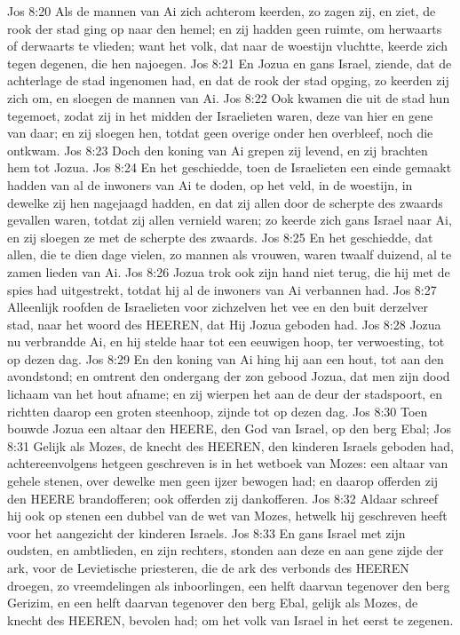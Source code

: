 Jos 8:20  Als de mannen van Ai zich achterom keerden, zo zagen zij, en ziet, de rook der stad ging op naar den hemel; en zij hadden geen ruimte, om herwaarts of derwaarts te vlieden; want het volk, dat naar de woestijn vluchtte, keerde zich tegen degenen, die hen najoegen.
Jos 8:21  En Jozua en gans Israel, ziende, dat de achterlage de stad ingenomen had, en dat de rook der stad opging, zo keerden zij zich om, en sloegen de mannen van Ai.
Jos 8:22  Ook kwamen die uit de stad hun tegemoet, zodat zij in het midden der Israelieten waren, deze van hier en gene van daar; en zij sloegen hen, totdat geen overige onder hen overbleef, noch die ontkwam.
Jos 8:23  Doch den koning van Ai grepen zij levend, en zij brachten hem tot Jozua.
Jos 8:24  En het geschiedde, toen de Israelieten een einde gemaakt hadden van al de inwoners van Ai te doden, op het veld, in de woestijn, in dewelke zij hen nagejaagd hadden, en dat zij allen door de scherpte des zwaards gevallen waren, totdat zij allen vernield waren; zo keerde zich gans Israel naar Ai, en zij sloegen ze met de scherpte des zwaards.
Jos 8:25  En het geschiedde, dat allen, die te dien dage vielen, zo mannen als vrouwen, waren twaalf duizend, al te zamen lieden van Ai.
Jos 8:26  Jozua trok ook zijn hand niet terug, die hij met de spies had uitgestrekt, totdat hij al de inwoners van Ai verbannen had.
Jos 8:27  Alleenlijk roofden de Israelieten voor zichzelven het vee en den buit derzelver stad, naar het woord des HEEREN, dat Hij Jozua geboden had.
Jos 8:28  Jozua nu verbrandde Ai, en hij stelde haar tot een eeuwigen hoop, ter verwoesting, tot op dezen dag.
Jos 8:29  En den koning van Ai hing hij aan een hout, tot aan den avondstond; en omtrent den ondergang der zon gebood Jozua, dat men zijn dood lichaam van het hout afname; en zij wierpen het aan de deur der stadspoort, en richtten daarop een groten steenhoop, zijnde tot op dezen dag.
Jos 8:30  Toen bouwde Jozua een altaar den HEERE, den God van Israel, op den berg Ebal;
Jos 8:31  Gelijk als Mozes, de knecht des HEEREN, den kinderen Israels geboden had, achtereenvolgens hetgeen geschreven is in het wetboek van Mozes: een altaar van gehele stenen, over dewelke men geen ijzer bewogen had; en daarop offerden zij den HEERE brandofferen; ook offerden zij dankofferen.
Jos 8:32  Aldaar schreef hij ook op stenen een dubbel van de wet van Mozes, hetwelk hij geschreven heeft voor het aangezicht der kinderen Israels.
Jos 8:33  En gans Israel met zijn oudsten, en ambtlieden, en zijn rechters, stonden aan deze en aan gene zijde der ark, voor de Levietische priesteren, die de ark des verbonds des HEEREN droegen, zo vreemdelingen als inboorlingen, een helft daarvan tegenover den berg Gerizim, en een helft daarvan tegenover den berg Ebal, gelijk als Mozes, de knecht des HEEREN, bevolen had; om het volk van Israel in het eerst te zegenen.
